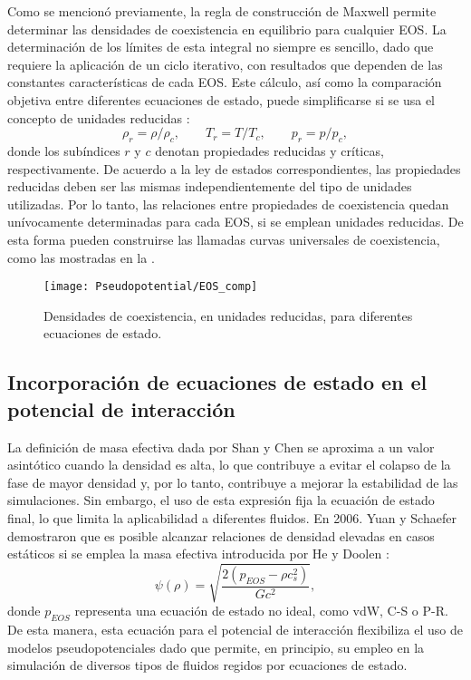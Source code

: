 Como se mencion\'o previamente, la regla de construcci\'on de Maxwell permite determinar las densidades de coexistencia en equilibrio para cualquier EOS. La determinaci\'on de los l\'imites de esta integral no siempre es sencillo, dado que requiere la aplicaci\'on de un ciclo iterativo, con resultados que dependen de las constantes caracter\'isticas de cada EOS. Este c\'alculo, as\'i como la comparaci\'on objetiva entre diferentes ecuaciones de estado, puede simplificarse si se usa el concepto de unidades reducidas \cite{mcquarrie_molecular_1999}:
\begin{equation}
	\rho_r = \rho / \rho_c, \qquad T_r = T / T_c, \qquad p_r = p / p_c,
\end{equation}
donde los sub\'indices $r$ y $c$ denotan propiedades reducidas y cr\'iticas, respectivamente. De acuerdo a la ley de estados correspondientes, las propiedades reducidas deben ser las mismas independientemente del tipo de unidades utilizadas. Por lo tanto, las relaciones entre propiedades de coexistencia quedan un\'ivocamente determinadas para cada EOS, si se emplean unidades reducidas. De esta forma pueden construirse las llamadas curvas universales de coexistencia, como las mostradas en la .

\begin{figure}[ht]
	\centering
	\texttt{[image: Pseudopotential/EOS\_comp]}
	\caption{Densidades de coexistencia, en unidades reducidas, para diferentes ecuaciones de estado.}
	\label{fig:EOS}
\end{figure}




\subsection{Incorporaci\'on de ecuaciones de estado en el potencial de interacci\'on}

La definici\'on de masa efectiva dada por Shan y Chen se aproxima a un valor asint\'otico cuando la densidad es alta, lo que contribuye a evitar el colapso de la fase de mayor densidad y, por lo tanto, contribuye a mejorar la estabilidad de las simulaciones. Sin embargo, el uso de esta expresi\'on fija la ecuaci\'on de estado final, lo que limita la aplicabilidad a diferentes fluidos. En 2006. Yuan y Schaefer \cite{yuan_equations_2006} demostraron que es posible alcanzar relaciones de densidad elevadas en casos est\'aticos si se emplea la masa efectiva introducida por He y Doolen \cite{he_thermodynamic_2002}:
\begin{equation}
	\psi(\rho) = \sqrt{\dfrac{2(p_{EOS} - \rho c_s^2)}{Gc^2}},
	\label{eq:potencial}
\end{equation}
donde $p_{EOS}$ representa una ecuaci\'on de estado no ideal, como vdW, C-S o P-R. De esta manera, esta ecuaci\'on para el potencial de interacci\'on flexibiliza el uso de modelos pseudopotenciales dado que permite, en principio, su empleo en la simulaci\'on de diversos tipos de fluidos regidos por ecuaciones de estado.




